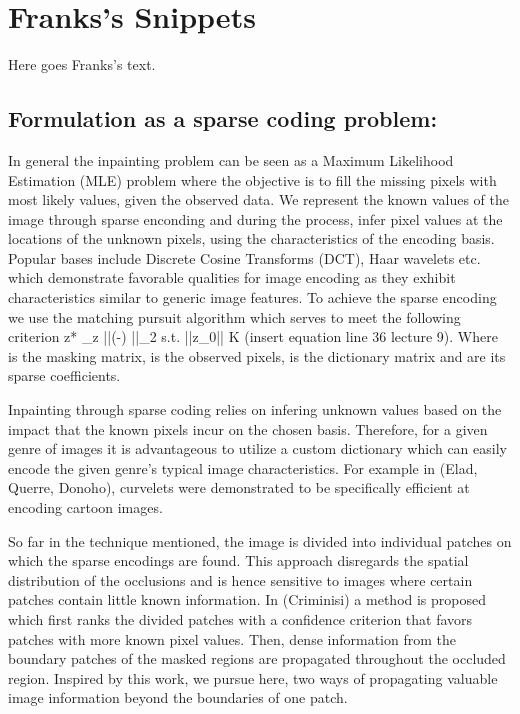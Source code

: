 \section{Franks's Snippets}
Here goes Franks's text.

\subsection{Formulation as a sparse coding problem:}

In general the inpainting problem can be seen as a Maximum Likelihood Estimation (MLE) problem where the objective is to fill the missing pixels with most likely values, given the observed data. We represent the known values of the image through sparse enconding and during the process, infer pixel values at the locations of the unknown pixels, using the characteristics of the encoding basis. Popular bases include Discrete Cosine Transforms (DCT), Haar wavelets etc. which demonstrate favorable qualities for image encoding as they exhibit characteristics similar to generic image features. To achieve the sparse encoding we use the matching pursuit algorithm which serves to meet the following criterion
 		z* \ni \arg\max_{z} ||(-) ||_2
		s.t. ||z_0||  \leqslant K      (insert equation line 36 lecture 9).
Where  is the masking matrix,  is the observed pixels,  is the dictionary matrix and  are its sparse coefficients. 

Inpainting through sparse coding relies on infering unknown values based on the impact that the known pixels incur on the chosen basis. Therefore, for a given genre of images it is advantageous to utilize a custom dictionary which can easily encode the given genre's typical image characteristics. For example  in (Elad, Querre, Donoho), curvelets were demonstrated to be specifically efficient at encoding cartoon images. 

So far in the technique mentioned, the image is divided into individual patches on which the sparse encodings are found. This approach disregards the spatial distribution of the occlusions and is hence sensitive to images where certain patches contain little known information. In (Criminisi) a method is proposed which first ranks the divided patches with a confidence criterion that favors patches with more known pixel values. Then, dense information from the boundary patches of the masked regions are propagated throughout the occluded region. Inspired by this work, we pursue here, two ways of propagating valuable image information beyond the boundaries of one patch.

